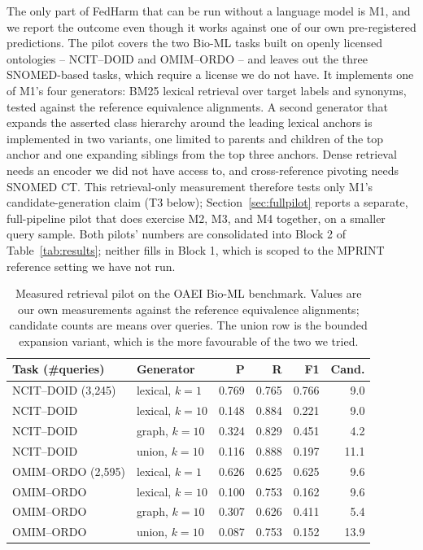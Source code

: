 \documentclass[conference]{IEEEtran}
\begin{document}
The only part of FedHarm that can be run without a language model is M1, and we report the outcome even though it works against one of our own pre-registered predictions. The pilot covers the two Bio-ML tasks built on openly licensed ontologies -- NCIT--DOID and OMIM--ORDO -- and leaves out the three SNOMED-based tasks, which require a license we do not have. It implements one of M1's four generators: BM25 lexical retrieval over target labels and synonyms, tested against the reference equivalence alignments. A second generator that expands the asserted class hierarchy around the leading lexical anchors is implemented in two variants, one limited to parents and children of the top anchor and one expanding siblings from the top three anchors. Dense retrieval needs an encoder we did not have access to, and cross-reference pivoting needs SNOMED CT. This retrieval-only measurement therefore tests only M1's candidate-generation claim (T3 below); Section~\ref{sec:fullpilot} reports a separate, full-pipeline pilot that does exercise M2, M3, and M4 together, on a smaller query sample. Both pilots' numbers are consolidated into Block 2 of Table~\ref{tab:results}; neither fills in Block 1, which is scoped to the MPRINT reference setting we have not run.

\begin{table}[t]
\caption{Measured retrieval pilot on the OAEI Bio-ML benchmark. Values are our own measurements against the reference equivalence alignments; candidate counts are means over queries. The union row is the bounded expansion variant, which is the more favourable of the two we tried.}
\label{tab:pilot}
\centering
\footnotesize
\begin{tabular}{@{}llrrrr@{}}
\toprule
\textbf{Task (\#queries)} & \textbf{Generator} & \textbf{P} & \textbf{R} & \textbf{F1} & \textbf{Cand.} \\
\midrule
NCIT--DOID (3{,}245) & lexical, $k{=}1$  & 0.769 & 0.765 & 0.766 & 9.0 \\
NCIT--DOID           & lexical, $k{=}10$ & 0.148 & 0.884 & 0.221 & 9.0 \\
NCIT--DOID           & graph, $k{=}10$   & 0.324 & 0.829 & 0.451 & 4.2 \\
NCIT--DOID           & union, $k{=}10$   & 0.116 & 0.888 & 0.197 & 11.1 \\
\midrule
OMIM--ORDO (2{,}595) & lexical, $k{=}1$  & 0.626 & 0.625 & 0.625 & 9.6 \\
OMIM--ORDO           & lexical, $k{=}10$ & 0.100 & 0.753 & 0.162 & 9.6 \\
OMIM--ORDO           & graph, $k{=}10$   & 0.307 & 0.626 & 0.411 & 5.4 \\
OMIM--ORDO           & union, $k{=}10$   & 0.087 & 0.753 & 0.152 & 13.9 \\
\bottomrule
\end{tabular}
\end{table}
\end{document}

